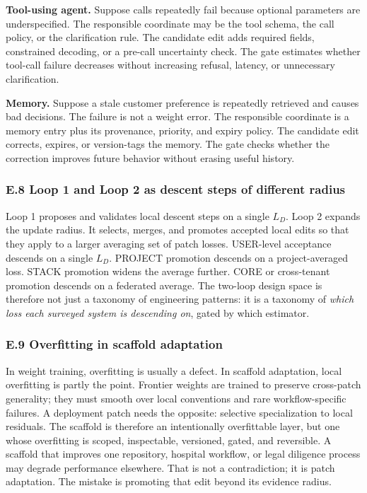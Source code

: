 \textbf{Tool-using agent.} Suppose calls repeatedly fail because
optional parameters are underspecified. The responsible coordinate may
be the tool schema, the call policy, or the clarification rule. The
candidate edit adds required fields, constrained decoding, or a pre-call
uncertainty check. The gate estimates whether tool-call failure
decreases without increasing refusal, latency, or unnecessary
clarification.

\textbf{Memory.} Suppose a stale customer preference is repeatedly
retrieved and causes bad decisions. The failure is not a weight error.
The responsible coordinate is a memory entry plus its provenance,
priority, and expiry policy. The candidate edit corrects, expires, or
version-tags the memory. The gate checks whether the correction improves
future behavior without erasing useful history.

\subsubsection{E.8 Loop 1 and Loop 2 as descent steps of different
radius}\label{e.8-loop-1-and-loop-2-as-descent-steps-of-different-radius}

Loop 1 proposes and validates local descent steps on a single \(L_D\).
Loop 2 expands the update radius. It selects, merges, and promotes
accepted local edits so that they apply to a larger averaging set of
patch losses. USER-level acceptance descends on a single \(L_D\).
PROJECT promotion descends on a project-averaged loss. STACK promotion
widens the average further. CORE or cross-tenant promotion descends on a
federated average. The two-loop design space is therefore not just a
taxonomy of engineering patterns: it is a taxonomy of \emph{which loss
each surveyed system is descending on}, gated by which estimator.

\subsubsection{E.9 Overfitting in scaffold
adaptation}\label{e.9-overfitting-in-scaffold-adaptation}

In weight training, overfitting is usually a defect. In scaffold
adaptation, local overfitting is partly the point. Frontier weights are
trained to preserve cross-patch generality; they must smooth over local
conventions and rare workflow-specific failures. A deployment patch
needs the opposite: selective specialization to local residuals. The
scaffold is therefore an intentionally overfittable layer, but one whose
overfitting is scoped, inspectable, versioned, gated, and reversible. A
scaffold that improves one repository, hospital workflow, or legal
diligence process may degrade performance elsewhere. That is not a
contradiction; it is patch adaptation. The mistake is promoting that
edit beyond its evidence radius.

